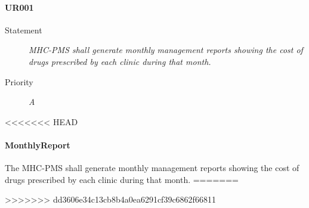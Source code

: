 \paragraph{UR001}
\begin{description}
  \item [Statement] 
    \textit{\gls{MHC-PMS} shall generate monthly management reports showing the
    cost of drugs prescribed by each clinic during that month.}
  \item [Priority] \textit{A}
\end{description}

<<<<<<< HEAD
\paragraph{MonthlyReport} The \gls{MHC-PMS} shall generate monthly management reports showing the cost of drugs
prescribed by each clinic during that month.
=======

>>>>>>> dd3606e34c13cb8b4a0ea6291cf39c6862f66811
